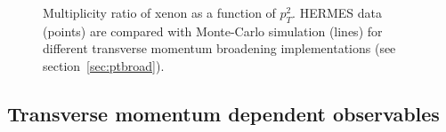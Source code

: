 \begin{figure}[tbp]
  \centering
{}
\caption {Multiplicity ratio of xenon as a function of $p_T^2$. HERMES data~%
\cite{Airapetian:2011jp} (points) are compared with Monte-Carlo simulation 
(lines) for different transverse momentum broadening implementations (see 
section~\ref{sec:ptbroad}).}
\label{fig:PtC-RPts}
\end{figure}


\subsection{Transverse momentum dependent observables}

